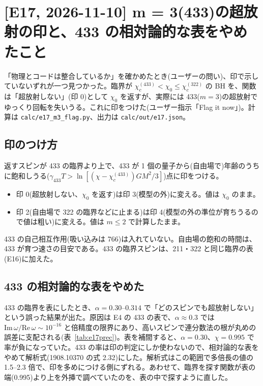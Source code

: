 \section{[E17, 2026-11-10] m = 3(433)の超放射の印と、433 の相対論的な表をやめたこと}\label{sec:e17}

「物理とコードは整合しているか」を確かめたとき(ユーザーの問い)、印で示していないずれが一つ見つかった。臨界が $\chi_c^{(433)}<\chi_0\le\chi_c^{(322)}$ の BH を、関数は「超放射しない」(印 0)として $\chi_0$ を返すが、実際には 433($m=3$)の超放射でゆっくり回転を失いうる。これに印をつけた(ユーザー指示「Flag it now」)。計算は \texttt{calc/e17\_m3\_flag.py}、出力は \texttt{calc/out/e17.json}。

\subsection{印のつけ方}

返すスピンが 433 の臨界より上で、433 が 1 個の量子から(自由場で)年齢のうちに飽和しうる($\gamma_{433}T>\ln[(\chi-\chi_c^{(433)})GM^2/3]$)点に印をつける。
\begin{itemize}
\item 印 0(超放射しない、$\chi_0$ を返す)は印 3(模型の外)に変える。値は $\chi_0$ のまま。
\item 印 2(自由場で 322 の臨界などに止まる)は印 4(模型の外の準位が育ちうるので値は粗い)に変える。値は $m\le2$ で計算したまま。
\end{itemize}
433 の自己相互作用(吸い込みは 766)は入れていない。自由場の飽和の時間は、433 が育つ速さの目安である。433 の臨界スピンは、211・322 と同じ臨界の表(E16)に加えた。

\subsection{433 の相対論的な表をやめた}

433 の臨界を表にしたとき、$\alpha=0.30$--$0.314$ で「どのスピンでも超放射しない」という誤った結果が出た。原因は E4 の 433 の表で、$\alpha\approx0.3$ では $\mathrm{Im}\,\omega/\mathrm{Re}\,\omega\sim10^{-16}$ と倍精度の限界にあり、高いスピンで連分数法の根が丸めの誤差に支配される(表~\ref{tab:e17prec})。表を補間すると、$\alpha=0.30$、$\chi=0.995$ で率が負になっていた。433 の率は印の判定にしか使わないので、相対論的な表をやめて解析式(1908.10370 の式 2.32)にした。解析式はこの範囲で多倍長の値の 1.5--2.3 倍で、印を多めにつける側にずれる。あわせて、臨界を探す関数が表の端(0.995)より上を外挿で調べていたのを、表の中で探すように直した。

